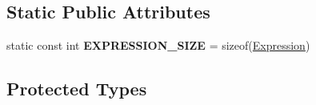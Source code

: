 \subsection*{Static Public Attributes}
\begin{DoxyCompactItemize}
\item 
static const int {\bfseries E\+X\+P\+R\+E\+S\+S\+I\+O\+N\+\_\+\+S\+I\+ZE} = sizeof(\hyperlink{struct_object_script_1_1_o_s_1_1_core_1_1_compiler_1_1_expression}{Expression})\hypertarget{class_object_script_1_1_o_s_1_1_core_1_1_compiler_adc25e863683e1253ab630b9b7c3703fa}{}\label{class_object_script_1_1_o_s_1_1_core_1_1_compiler_adc25e863683e1253ab630b9b7c3703fa}

\end{DoxyCompactItemize}
\subsection*{Protected Types}
